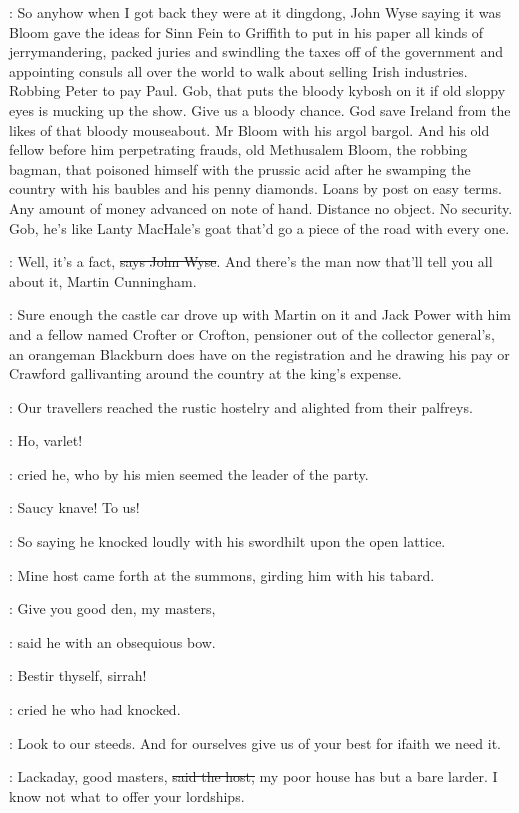 \Nq:
So anyhow when I got back they were at it dingdong, John Wyse
saying it was Bloom gave the ideas for Sinn Fein to Griffith to put in his
paper all kinds of jerrymandering, packed juries and swindling the taxes
off of the government and appointing consuls all over the world to walk
about selling Irish industries. Robbing Peter to pay Paul. Gob, that puts
the bloody kybosh on it if old sloppy eyes is mucking up the show. Give us
a bloody chance. God save Ireland from the likes of that bloody
mouseabout. Mr Bloom with his argol bargol.
And his old fellow before him
perpetrating frauds, old Methusalem Bloom, the robbing bagman, that
poisoned himself with the prussic acid after he swamping the country with
his baubles and his penny diamonds. Loans by post on easy terms. Any
amount of money advanced on note of hand. Distance no object. No security.
Gob, he's like Lanty MacHale's goat that'd go a piece of the road with
every one.

\johnwyse:
Well, it's a fact, \sout{says John Wyse}.
And there's the man now that'll tell
you all about it, Martin Cunningham.

\Nq:
Sure enough the castle car drove up with Martin on it and Jack Power
with him and a fellow named Crofter or Crofton, pensioner out of the
collector general's,
an orangeman Blackburn does have on the registration
and he drawing his pay or Crawford gallivanting around the country at the
king's expense.

:
Our travellers reached the rustic hostelry and alighted from their
palfreys.

\cunningham:
Ho, varlet!

:
cried he, who by his mien seemed the leader of the party.

\cunningham:
Saucy knave! To us!

:
So saying he knocked loudly with his swordhilt upon the open lattice.

:
Mine host came forth at the summons, girding him with his tabard.

\terry:
Give you good den, my masters,

:
said he with an obsequious bow.

\cunningham:
Bestir thyself, sirrah!

:
cried he who had knocked.

\cunningham:
Look to our steeds.
And for ourselves give us of your best for ifaith we need it.

\terry:
Lackaday, good masters, \sout{said the host,}
my poor house has but a bare
larder. I know not what to offer your lordships.

